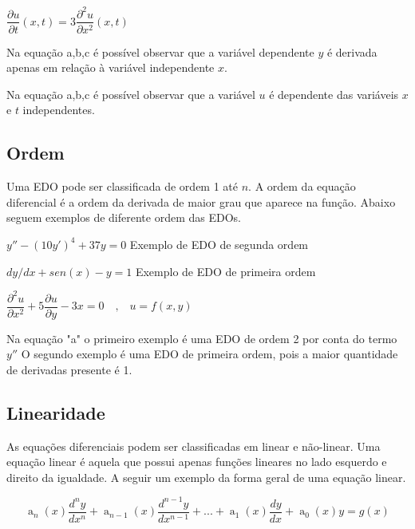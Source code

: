  $ \dfrac{\partial u}{\partial t}(x,t) = 3 \dfrac{\partial^2u}{\partial x^2}(x,t) $  


Na equação a,b,c é possível observar que a variável dependente $y$ é derivada apenas em relação à variável independente $x$.

Na equação a,b,c é possível observar que a variável $u$ é dependente das variáveis $x$ e $t$ independentes.


\subsection[Ordem]{Ordem}

Uma EDO pode ser classificada de ordem 1 até $n$. A ordem da equação diferencial é a ordem da derivada de maior grau que aparece na função. Abaixo seguem exemplos de diferente ordem das EDOs. 


$  y'' - (10y')^4 + 37y = 0  $  Exemplo de EDO de segunda ordem 

$ dy/dx + sen(x) - y = 1 $  Exemplo de EDO de primeira ordem 

 $
\dfrac{\partial^2u}{\partial x^2} + 5 \dfrac{\partial u}{\partial y} - 3x = 0 \quad \textrm{,} \quad   u = f(x,y)
$


Na equação "a" o primeiro exemplo é uma EDO de ordem 2 por conta do termo $y''$
O segundo exemplo é uma EDO de primeira ordem, pois a maior quantidade de derivadas presente é 1.

\begin{comment}
REESCREVER PARA MELHOR CLAREZA
No terceiro exemplo temos uma EDP, pois a variável dependente $u$ está derivada 2 vezes em relação à variável independente $x$ e derivada 1 vez em relação à independente $y$. Portanto como o maior número de derivadas é 2, nos dá uma derivada de segunda ordem.
\end{comment}

\subsection[Linearidade]{Linearidade}
As equações diferenciais podem ser classificadas em linear e não-linear.
Uma equação linear é aquela que possui apenas funções lineares no lado esquerdo e direito da igualdade. A seguir um exemplo da forma geral de uma equação linear.
\begin{center}
\begin{equation} \label{formaGeral}
 \operatorname{a}_{n}(x) \dfrac{d^ny}{dx^n} + \operatorname{a}_{n-1}(x)\dfrac{d^{n-1}y}{dx^{n-1}} + ... + \operatorname{a}_{1}(x)\dfrac{dy}{dx} + \operatorname{a}_{0}(x)y = g(x) 
\end{equation}
\end{center}

